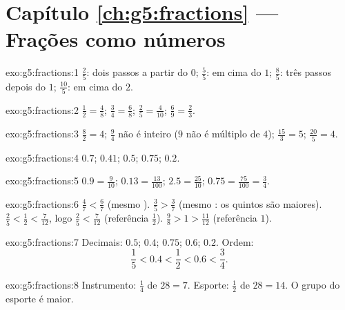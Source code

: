 \section*{Capítulo \ref{ch:g5:fractions} --- Frações como números}

\begin{solution}{exo:g5:fractions:1}
$\frac25$: dois passos a partir do $0$; $\frac55$: em cima do $1$;
$\frac85$: três passos depois do $1$; $\frac{10}{5}$: em cima do $2$.
\end{solution}

\begin{solution}{exo:g5:fractions:2}
$\frac12 = \frac48$; \quad $\frac34 = \frac68$; \quad
$\frac25 = \frac{4}{10}$; \quad $\frac69 = \frac23$.
\end{solution}

\begin{solution}{exo:g5:fractions:3}
$\frac82 = 4$; \quad $\frac94$ não é inteiro ($9$ não é múltiplo de
$4$); \quad $\frac{15}{3} = 5$; \quad $\frac{20}{5} = 4$.
\end{solution}

\begin{solution}{exo:g5:fractions:4}
$0.7$; \quad $0.41$; \quad $0.5$; \quad $0.75$; \quad $0.2$.
\end{solution}

\begin{solution}{exo:g5:fractions:5}
$0.9 = \frac{9}{10}$; \quad $0.13 = \frac{13}{100}$; \quad
$2.5 = \frac{25}{10}$; \quad $0.75 = \frac{75}{100} = \frac34$.
\end{solution}

\begin{solution}{exo:g5:fractions:6}
$\frac47 < \frac67$ (mesmo ). \quad
$\frac35 > \frac37$ (mesmo : os quintos são maiores). \quad
$\frac25 < \frac12 < \frac{7}{12}$, logo $\frac25 < \frac{7}{12}$
(referência $\frac12$). \quad
$\frac98 > 1 > \frac{11}{12}$ (referência $1$).
\end{solution}

\begin{solution}{exo:g5:fractions:7}
Decimais: $0.5$; $0.4$; $0.75$; $0.6$; $0.2$. Ordem:
\[
\frac15 < 0.4 < \frac12 < 0.6 < \frac34 .
\]
\end{solution}

\begin{solution}{exo:g5:fractions:8}
Instrumento: $\frac14$ de $28 = 7$. Esporte: $\frac12$ de $28 = 14$.
O grupo do esporte é maior.
\end{solution}

